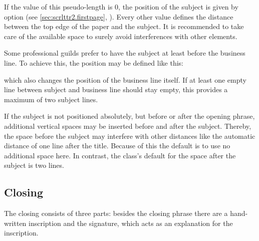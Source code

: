 \begin{Declaration}
\end{Declaration}
%
If the value of this pseudo-length is 0, the
position of the subject is given by option
%
 (see
\autoref{sec:scrlttr2.firstpage}, ).
Every other value defines the distance between the top edge of the paper and
the subject. It is recommended to take care of the available
space to surely avoid interferences with other elements.
\begin{Example}
  Some professional guilds prefer to have the subject at least before the
  business line. To achieve this, the position may be defined like this:
  which also changes the position of the business line itself. If at least one
  empty line between subject and business line should stay empty, this
  provides a maximum of two subject lines.
\end{Example}
\EndIndexGroup


\begin{Declaration}
\end{Declaration}
%
If the subject is not positioned absolutely, but before or after the opening
phrase, additional vertical spaces may be inserted before and after the
subject. Thereby, the space before the subject may interfere with other
distances like the automatic distance of one line after the title. Because of
this the default is to use no additional space here. In contrast, the class's
default for the space after the subject is two lines.%
%
\EndIndexGroup
%
\EndIndexGroup


\subsection{Closing}
\BeginIndexGroup
{}

The closing consists of three parts: besides the closing phrase there
are a hand-written inscription and the signature, which acts as an
explanation for the inscription.

